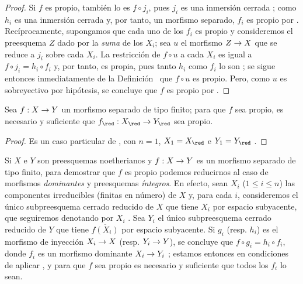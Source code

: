 \documentclass[oneside,10pt]{amsart}
\makeatletter
\renewcommand{\leq}{\leqslant}
\newcommand{\ega@arrow}[2]{\mathchoice{#1}{#2}{#2}{#2}}
\renewcommand{\to}{\ega@arrow{\longrightarrow}{\rightarrow}}
\newcommand{\oldpage}[2][]{\marginnote{\normalfont\footnotesize\textbf{#1}~|~#2}\ignorespaces}
\let\EGAOriginalLabel\label
\renewcommand{\label}[1]{\phantomsection\EGAOriginalLabel{#1}}
\makeatother
\begin{document}
\oldpage[II]{102}
\begin{proof}
Si $f$ es propio, también lo es $f\circ j_i$, pues $j_i$ es una inmersión cerrada ;
como $h_i$ es una inmersión cerrada y, por tanto, un morfismo separado, $f_i$ es propio por .
Recíprocamente, supongamos que cada uno de los $f_i$ es propio y consideremos el preesquema $Z$ dado por la \emph{suma} de los $X_i$; sea $u$ el morfismo $Z\to X$ que se reduce a $j_i$ sobre cada $X_i$.
La restricción de $f\circ u$ a cada $X_i$ es igual a $f\circ j_i=h_i\circ f_i$ y, por tanto, es propia, pues tanto $h_i$ como $f_i$ lo son ;
se sigue entonces inmediatamente de la Definición~ que $f\circ u$ es propio.
Pero, como $u$ es sobreyectivo por hipótesis, se concluye que $f$ es propio por .
\end{proof}

\begin{corollary}[5.4.6]
\label{II.5.4.6}
Sea $f:X\to Y$ un morfismo separado de tipo finito; para que $f$ sea propio, es necesario y suficiente que $f_\red:X_\red\to Y_\red$ sea propio.
\end{corollary}

\begin{proof}
Es un caso particular de , con $n=1$, $X_1=X_\red$ e $Y_1=Y_\red$ .
\end{proof}

\begin{env}[5.4.7]
\label{II.5.4.7}
Si $X$ e $Y$ son preesquemas noetherianos y $f:X\to Y$ es un morfismo separado de tipo finito, para demostrar que $f$ es propio podemos reducirnos al caso de morfismos \emph{dominantes} y preesquemas \emph{íntegros}.
En efecto, sean $X_i$ ($1\leq i\leq n$) las componentes irreducibles (finitas en número) de $X$ y, para cada $i$, consideremos el único subpreesquema cerrado reducido de $X$ que tiene $X_i$ por espacio subyacente, que seguiremos denotando por $X_i$ .
Sea $Y_i$ el único subpreesquema cerrado reducido de $Y$ que tiene $\overline{f(X_i)}$ por espacio subyacente.
Si $g_i$ (resp. $h_i$) es el morfismo de inyección $X_i\to X$ (resp. $Y_i\to Y$), se concluye que $f\circ g_i=h_i\circ f_i$, donde $f_i$ es un morfismo dominante $X_i\to Y_i$ ;
estamos entonces en condiciones de aplicar , y para que $f$ sea propio es necesario y suficiente que todos los $f_i$ lo sean.
\end{env}
\end{document}
